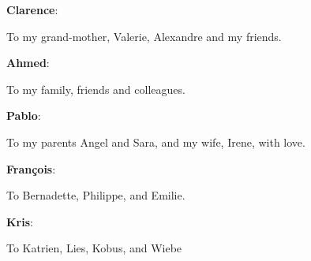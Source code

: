 
\clearpage           %
\thispagestyle{empty}%
{%
\itshape             %
\center

\textbf{Clarence}:\par
    To my grand-mother, Valerie, Alexandre and my friends.\par\vspace*{\baselineskip}
    \textbf{Ahmed}:\par
    To my family, friends and colleagues.\par\vspace*{\baselineskip}
    \textbf{Pablo}:\par
    To my parents Angel and Sara, and my wife, Irene, with love.\par\vspace*{\baselineskip}
    \textbf{François}:\par
    To Bernadette, Philippe, and Emilie.\par\vspace*{\baselineskip}
    \textbf{Kris}:\par
    To Katrien, Lies, Kobus, and Wiebe\par\vspace*{\baselineskip}
\par
}%

\clearpage           %

